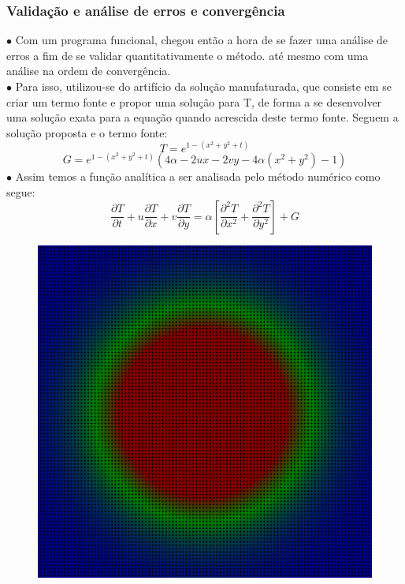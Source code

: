 \documentclass[xcolor=dvipsnames,10pt,aspectratio=169]{beamer}
\begin{document}
	\begin{frame}
		\frametitle{Validação e análise de erros e convergência}
		\begin{minipage}[h!]{0.77\textwidth}
			$\bullet$ Com um programa funcional, chegou então a hora de se fazer uma análise de erros a fim de se validar quantitativamente o método. até mesmo com uma análise na ordem de convergência.  \\
			$\bullet$ Para isso, utilizou-se do artifício da solução manufaturada, que consiste em se criar um termo fonte e propor uma solução para T, de forma a se desenvolver uma solução exata para a equação quando acrescida deste termo fonte. Seguem a solução proposta e o termo fonte:
			\begin{equation}
				T = e ^{1 - (x^2 + y^2 + t)}
			\end{equation}
			\begin{equation}
				G = e^{1 - (x^2 + y^2 + t)} \left( 4 \alpha - 2 u x - 2 v y - 4 \alpha (x^2 + y^2) - 1 \right)
			\end{equation}
			$\bullet$ Assim temos a função analítica a ser analisada pelo método numérico como segue:
			\begin{equation}
				\frac{\partial T}{\partial t} + u \frac{\partial T}{\partial x} + v \frac{\partial T}{\partial y} = \alpha \left[  \frac{\partial^2 T}{\partial x^2} + \frac{\partial^2 T}{\partial y^2}   \right] + G
			\end{equation}
		\end{minipage}
		\begin{minipage}[h!]{0.17\textwidth}
			\begin{figure}[h!]
				\centering
				\includegraphics[trim = {0cm 0cm 0cm 0cm}, clip , angle=0, scale=0.1]{images/Analise_manufaturada}

\end{figure}
\end{minipage}
\end{frame}
\end{document}
